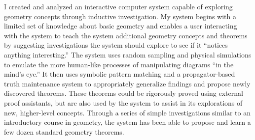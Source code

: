 %
%
%
I created and analyzed an interactive computer system capable of
exploring geometry concepts through inductive investigation.  My
system begins with a limited set of knowledge about basic geometry and
enables a user interacting with the system to teach the system
additional geometry concepts and theorems by suggesting investigations
the system should explore to see if it ``notices anything
interesting.''  The system uses random sampling and physical
simulations to emulate the more human-like processes of manipulating
diagrams ``in the mind's eye.'' It then uses symbolic pattern matching
and a propagator-based truth maintenance system to appropriately
generalize findings and propose newly discovered theorems. These
theorems could be rigorously proved using external proof assistants,
but are also used by the system to assist in its explorations of new,
higher-level concepts. Through a series of simple investigations
similar to an introductory course in geometry, the system has been
able to propose and learn a few dozen standard geometry theorems.
